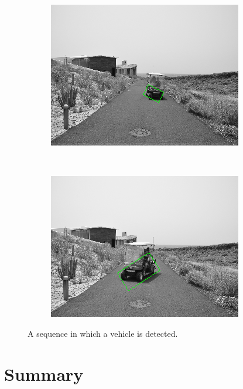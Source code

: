 \begin{figure}[h!]
\begin{subfigure}[b]{0.24\columnwidth}
	    \includegraphics[width=\textwidth]{sequence/seq7}\label{fig:seq7}
        \end{subfigure}%
        ~
        \begin{subfigure}[b]{0.24\columnwidth}
	    \includegraphics[width=\textwidth]{sequence/seq8}\label{fig:seq8}
        \end{subfigure}%
        \caption{A sequence in which a vehicle is detected.}\label{fig:cp02_sequence_example}
\end{figure}

\section{Summary}\label{ch:chapter02_03}

